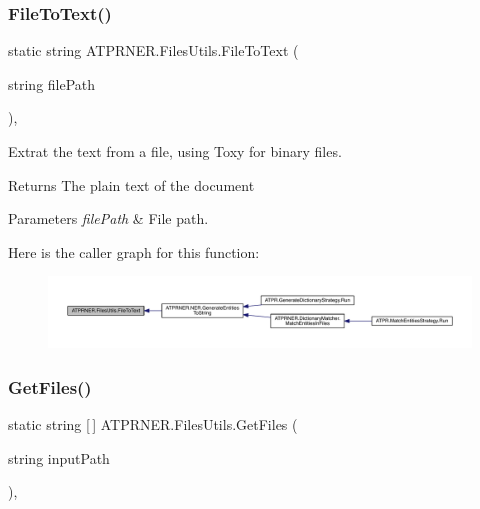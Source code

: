 \subsubsection{\texorpdfstring{File\+To\+Text()}{FileToText()}}
{\footnotesize\ttfamily static string A\+T\+P\+R\+N\+E\+R.\+Files\+Utils.\+File\+To\+Text (\begin{DoxyParamCaption}\item[{string}]{file\+Path }\end{DoxyParamCaption})\hspace{0.3cm}{\ttfamily [inline]}, {\ttfamily [static]}}



Extrat the text from a file, using Toxy for binary files. 

\begin{DoxyReturn}{Returns}
The plain text of the document
\end{DoxyReturn}

\begin{DoxyParams}{Parameters}
{\em file\+Path} & File path.\\
\hline
\end{DoxyParams}
Here is the caller graph for this function\+:
\nopagebreak
\begin{figure}[H]
\begin{center}
\leavevmode
\includegraphics[width=350pt]{d5/de9/class_a_t_p_r_n_e_r_1_1_files_utils_adaf763c34895368bcfe1254086d87f99_icgraph}
\end{center}
\end{figure}
\hypertarget{class_a_t_p_r_n_e_r_1_1_files_utils_aa9ee9ca4b22ddc16322bff7ea1d979bb}{}\label{class_a_t_p_r_n_e_r_1_1_files_utils_aa9ee9ca4b22ddc16322bff7ea1d979bb} 
\subsubsection{\texorpdfstring{Get\+Files()}{GetFiles()}}
{\footnotesize\ttfamily static string \mbox{[}$\,$\mbox{]} A\+T\+P\+R\+N\+E\+R.\+Files\+Utils.\+Get\+Files (\begin{DoxyParamCaption}\item[{string}]{input\+Path }\end{DoxyParamCaption})\hspace{0.3cm}{\ttfamily [inline]}, {\ttfamily [static]}}



